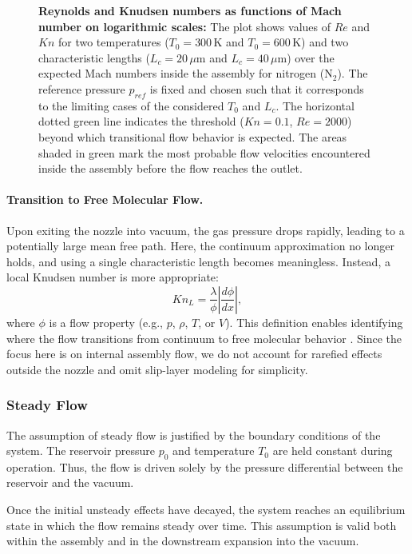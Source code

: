 	\begin{figure}[H]
		\centering
		
		\caption[Reynolds and Knudsen numbers as functions of Mach number on logarithmic scales.]{
			\textbf{Reynolds and Knudsen numbers as functions of Mach number on logarithmic scales:}
			The plot shows values of $Re$ and $Kn$ for two temperatures ($T_0 = 300\,\text{K}$ and $T_0 = 600\,\text{K}$) and two characteristic lengths ($L_c = 20\,\mu\text{m}$ and $L_c = 40\,\mu\text{m}$) over the expected Mach numbers inside the assembly for nitrogen ($\text{N}_2$).
			The reference pressure $p_{ref}$ is fixed and chosen such that it corresponds to the limiting cases of the considered $T_0$ and $L_c$.
			The horizontal dotted green line indicates the threshold ($Kn = 0.1$, $Re = 2000$) beyond which transitional flow behavior is expected.
			The areas shaded in green mark the most probable flow velocities encountered inside the assembly before the flow reaches the outlet.
		}
		\label{fig:knudsen-reynolds-plot}
	\end{figure}

	\paragraph{Transition to Free Molecular Flow.}
		Upon exiting the nozzle into vacuum, the gas pressure drops rapidly, leading to a potentially large mean free path.
		Here, the continuum approximation no longer holds, and using a single characteristic length becomes meaningless.
		Instead, a local Knudsen number is more appropriate:
		\begin{equation}
		  Kn_L
		  = \frac{\lambda}{\phi}\left|\frac{d\phi}{dx}\right|,
		\end{equation}
		where $\phi$ is a flow property (e.g., $p$, $\rho$, $T$, or $V$).
		This definition enables identifying where the flow transitions from continuum to free molecular behavior \cite{bird_dsmc_2013,Grabe2008,LiLam1964}.
		Since the focus here is on internal assembly flow, we do not account for rarefied effects outside the nozzle and omit slip-layer modeling for simplicity.

\subsubsection*{Steady Flow}
	The assumption of steady flow is justified by the boundary conditions of the system.
	The reservoir pressure $p_0$ and temperature $T_0$ are held constant during operation.
	Thus, the flow is driven solely by the pressure differential between the reservoir and the vacuum.

	Once the initial unsteady effects have decayed, the system reaches an equilibrium state in which the flow remains steady over time.
	This assumption is valid both within the assembly and in the downstream expansion into the vacuum.
	\cite{LiLam1964}
